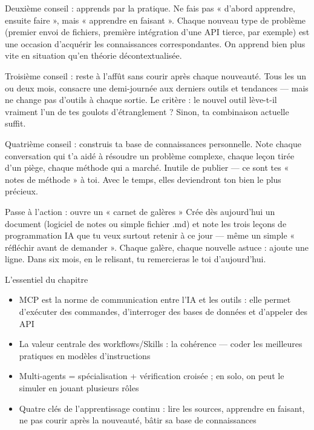 Deuxième conseil : apprends par la pratique. Ne fais pas « d'abord apprendre, ensuite faire », mais « apprendre en faisant ». Chaque nouveau type de problème (premier envoi de fichiers, première intégration d'une API tierce, par exemple) est une occasion d'acquérir les connaissances correspondantes. On apprend bien plus vite en situation qu'en théorie décontextualisée.

Troisième conseil : reste à l'affût sans courir après chaque nouveauté. Tous les un ou deux mois, consacre une demi-journée aux derniers outils et tendances — mais ne change pas d'outils à chaque sortie. Le critère : le nouvel outil lève-t-il vraiment l'un de tes goulots d'étranglement ? Sinon, ta combinaison actuelle suffit.

Quatrième conseil : construis ta base de connaissances personnelle. Note chaque conversation qui t'a aidé à résoudre un problème complexe, chaque leçon tirée d'un piège, chaque méthode qui a marché. Inutile de publier — ce sont tes « notes de méthode » à toi. Avec le temps, elles deviendront ton bien le plus précieux.

\begin{tcbpractice}{Passe à l'action : ouvre un « carnet de galères »}
Crée dès aujourd'hui un document (logiciel de notes ou simple fichier .md) et note les trois leçons de programmation IA que tu veux surtout retenir à ce jour — même un simple « réfléchir avant de demander ». Chaque galère, chaque nouvelle astuce : ajoute une ligne. Dans six mois, en le relisant, tu remercieras le toi d'aujourd'hui.

\end{tcbpractice}

\begin{tcbsummary}{L'essentiel du chapitre}
\begin{itemize}
  \item MCP est la norme de communication entre l'IA et les outils : elle permet d'exécuter des commandes, d'interroger des bases de données et d'appeler des API
  \item La valeur centrale des workflows/Skills : la cohérence — coder les meilleures pratiques en modèles d'instructions
  \item Multi-agents = spécialisation + vérification croisée ; en solo, on peut le simuler en jouant plusieurs rôles
  \item Quatre clés de l'apprentissage continu : lire les sources, apprendre en faisant, ne pas courir après la nouveauté, bâtir sa base de connaissances
\end{itemize}

\end{tcbsummary}
